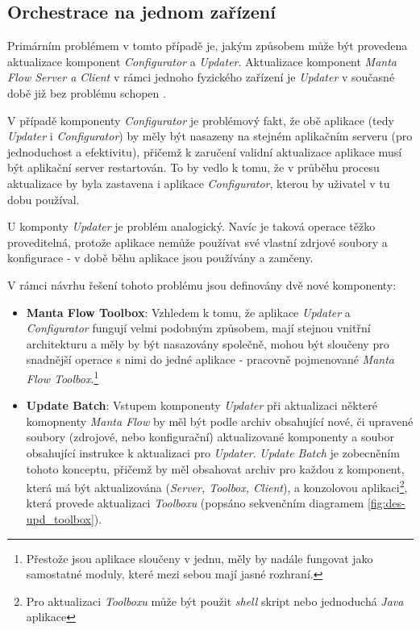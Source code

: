 \subsection{Orchestrace na jednom zařízení}
\label{sec:des_orchestration_singlenode}
Primárním problémem v tomto případě je, jakým způsobem může být provedena aktualizace komponent \textit{Configurator} a \textit{Updater}. Aktualizace komponent \textit{Manta Flow Server a Client} v rámci jednoho fyzického zařízení je \textit{Updater} v současné době již bez problému schopen \cite{Gondek16}.

V případě komponenty \textit{Configurator} je problémový fakt, že obě aplikace (tedy \textit{Updater} i \textit{Configurator}) by měly být nasazeny na stejném aplikačním serveru (pro jednoduchost a efektivitu), přičemž k zaručení validní aktualizace aplikace musí být aplikační server restartován. To by vedlo k tomu, že v průběhu procesu aktualizace by byla zastavena i aplikace \textit{Configurator}, kterou by uživatel v tu dobu používal.

U komponty \textit{Updater} je problém analogický. Navíc je taková operace těžko proveditelná, protože aplikace nemůže používat své vlastní zdrjové soubory a konfigurace - v době běhu aplikace jsou používány a zamčeny.

V rámci návrhu řešení tohoto problému jsou definovány dvě nové komponenty:

\begin{itemize}
   \item{\textbf{Manta Flow Toolbox}}: Vzhledem k tomu, že aplikace \textit{Updater} a \textit{Configurator} fungují velmi podobným způsobem, mají stejnou vnitřní architekturu a měly by být nasazovány společně, mohou být sloučeny pro snadnější operace s nimi do jedné aplikace - pracovně pojmenované \textit{Manta Flow Toolbox}.\footnote{Přestože jsou aplikace sloučeny v jednu, měly by nadále fungovat jako samostatné moduly, které mezi sebou mají jasné rozhraní.}
   \item{\textbf{Update Batch}}: Vstupem komponenty \textit{Updater} při aktualizaci některé komopnenty \textit{Manta Flow} by měl být podle \cite{Gondek16} archiv obsahující nové, či upravené soubory (zdrojové, nebo konfigurační) aktualizované komponenty a soubor obsahující instrukce k aktualizaci pro \textit{Updater}.
   \textit{Update Batch} je zobecněním tohoto konceptu, přičemž by měl obsahovat archiv pro každou z komponent, která má být aktualizována (\textit{Server, Toolbox, Client}), a konzolovou aplikaci\footnote{Pro aktualizaci \textit{Toolboxu} může být použit \textit{shell} skript nebo jednoduchá \textit{Java} aplikace}, která provede aktualizaci \textit{Toolboxu} (popsáno sekvenčním diagramem \ref{fig:des-upd_toolbox}).
\end{itemize}

